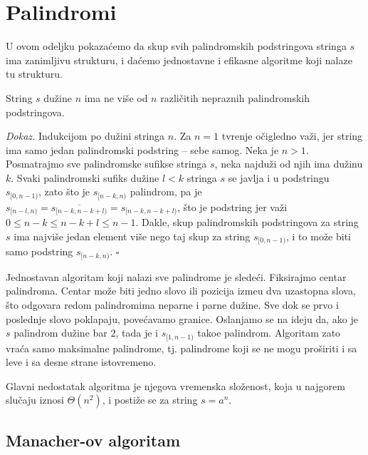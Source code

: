 \section{Palindromi}

U ovom odeljku pokaza\' cemo da skup svih palindromskih podstringova stringa $s$ ima zanimljivu strukturu, i da\' cemo jednostavne i efikasne algoritme koji nalaze tu strukturu.

\begin{thm}
\label{brojpalindroma}
String $s$ du\v zine $n$ ima ne vi\v se od $n$ razli\v citih nepraznih palindromskih podstringova.
\end{thm}

\textit{Dokaz.} Indukcijom po du\v zini stringa $n$. Za $n=1$ tvr\dj enje o\v cigledno va\v zi, jer string ima samo jedan palindromski podstring -- sebe samog. Neka je $n>1$. Posmatrajmo sve palindromske sufikse stringa $s$, neka najdu\v zi od njih ima du\v zinu $k$. Svaki palindromski sufiks du\v zine $l<k$ stringa $s$ se javlja i u podstringu $s_{[0,n-1)}$, zato \v sto je $s_{[n-k,n)}$ palindrom, pa je $s_{[n-l,n)} = \overline{s_{[n-k, n-k+l)}} = s_{[n-k, n-k+l)}$, \v sto je podstring jer va\v zi $0 \leq n-k \leq n-k+l \leq n-1$. Dakle, skup palindromskih podstringova za string $s$ ima najvi\v se jedan element vi\v se nego taj skup za string $s_{[0,n-1)}$, i to mo\v ze biti samo podstring $s_{[n-k,n)}$. \hfill $\square$

Jednostavan algoritam koji nalazi sve palindrome je slede\' ci. Fiksirajmo centar palindroma. Centar mo\v ze biti jedno slovo ili pozicija izme\dj u dva uzastopna slova, \v sto odgovara redom palindromima neparne i parne du\v zine. Sve dok se prvo i poslednje slovo poklapaju, pove\' cavamo granice. Oslanjamo se na ideju da, ako je $s$ palindrom du\v zine bar $2$, tada je i $s_{[1, n-1)}$ tako\dj e palindrom. Algoritam zato vra\' ca samo maksimalne palindrome, tj. palindrome koji se ne mogu pro\v siriti i sa leve i sa desne strane istovremeno.

\noindent
\begin{minipage}[l]{\textwidth}

\end{minipage}

Glavni nedostatak algoritma je njegova vremenska slo\v zenost, koja u najgorem slu\v caju iznosi $\Theta(n^2)$, i posti\v ze se za string $s = a^n$.

\subsection{Manacher-ov algoritam}

